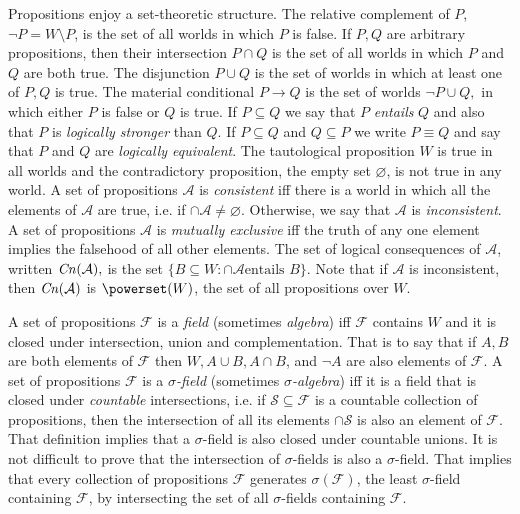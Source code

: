Propositions enjoy a set-theoretic structure. The relative complement of $P$,
$\neg P = W\setminus P$, is the set of all worlds in which $P$ is false. If
$P,Q$ are arbitrary propositions, then their intersection $P\cap Q$ is the set
of all worlds in which $P$ and $Q$ are both true. The disjunction $P\cup Q$ is
the set of worlds in which at least one of $P,Q$ is true. The material
conditional $P\rightarrow Q$ is the set of worlds $\neg P \cup Q,$ in which
either $P$ is false or $Q$ is true. If $P\subseteq Q$ we say that $P$ {\em
entails} $Q$ and also that $P$ is {\em logically stronger} than $Q$. If
$P\subseteq Q$ and $Q\subseteq P$ we write $P\equiv Q$ and say that $P$ and $Q$
are {\em logically equivalent}.  The tautological proposition $W$ is true in all
worlds and the contradictory proposition, the empty set $\varnothing$, is not
true in any world. A set of propositions $\mathcal{A}$ is {\em consistent} iff
there is a world in which all the elements of $\mathcal{A}$ are true, i.e. if
$\cap \mathcal{A} \neq \varnothing.$ Otherwise, we say that $\mathcal{A}$ is
{\em inconsistent}. A set of propositions $\mathcal{A}$ is {\em mutually
exclusive} iff the truth of any one element implies the falsehood of all other
elements. The set of logical consequences of $\mathcal{A}$, written
$\text{\textit{Cn}}(\mathcal{A}),$ is the set $ \{ B \subseteq W : \cap \mathcal{A} \text{
entails } B \}$. Note that if $\mathcal{A}$ is inconsistent, then
$\text{\textit{Cn}}(\mathcal{A})$ is $\powerset(W)$, the set of all propositions over $W$.  

A set of propositions $\mathcal{F}$ is a {\em field} (sometimes {\em algebra})
iff $\mathcal{F}$ contains $W$ and it is closed under intersection, union and
complementation. That is to say that if $A,B$ are both elements of $\mathcal{F}$
then $W,A\cup B,A\cap B$, and  $\neg A$ are also elements of $\mathcal{F}.$ A
set of propositions $\mathcal{F}$ is a {\em $\sigma$-field} (sometimes {\em
$\sigma$-algebra}) iff it is a field that is closed under {\em countable}
intersections, i.e. if $\mathcal{S}\subseteq \mathcal{F}$ is a countable
collection of propositions, then the intersection of all its elements $\cap
\mathcal{S}$ is also an element of $\mathcal{F}.$ That definition implies that a
$\sigma$-field is also closed under countable unions. It is not difficult to
prove that the intersection of $\sigma$-fields is also a $\sigma$-field. That
implies that every collection of propositions $\mathcal{F}$ generates
$\sigma(\mathcal{F})$, the least $\sigma$-field containing $\mathcal{F}$, by
intersecting the set of all $\sigma$-fields containing $\mathcal{F}$. 

